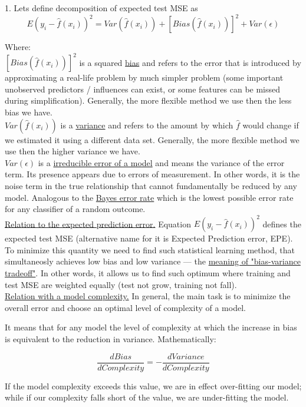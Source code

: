 \documentclass[a4paper,12pt,titlepage]{article} %
\begin{document}
1. Lets define decomposition of expected test MSE  as $$ E (y_{i} - \hat{f}(x_{i}))^{2} = Var(\hat{f}(x_{i})) + [Bias(\hat{f}(x_{i}))]^{2} + Var(\epsilon) $$

Where: \\
$ [Bias(\hat{f}(x_{i}))]^{2} $ is a squared \underline{bias} and refers to the error that is introduced by approximating a real-life problem by much simpler problem (some important unobserved predictors / influences can exist, or some features can be missed during simplification). Generally, the more flexible method we use then the less bias we have.\\

$ Var(\hat{f}(x_{i})) $ is a \underline{variance} and refers to the amount by which $ \hat{f} $ would change if we estimated it using a different data set. Generally, the more flexible method we use then the higher variance we have.\\

$ Var(\epsilon) $  is a \underline{irreducible error of a model} and means the variance of the error term. Its presence appears due to errors of measurement. In other words, it is the noise term in the true relationship that cannot fundamentally be reduced by any model. Analogous to the \underline{Bayes error rate} which is the lowest possible error rate for any classifier of a random outcome.\\

\underline{Relation to the expected prediction error.} Equation $ E (y_{i} - \hat{f}(x_{i}))^{2} $  defines the expected test MSE (alternative name for it is Expected Prediction error, EPE). To minimize this quantity we need to find such statistical learning method, that simultaneosly achieves low bias and low variance --- the \underline{meaning of "bias-variance tradeoff"}. In other words, it allows us to find such optimum where training and test MSE are weighted equally (test not grow, training not fall).\\

\underline{Relation with a model complexity.} In general, the main task is to minimize the overall error and choose an optimal level of complexity of a model. 

It means that for any model the level of complexity at which the increase in bias is equivalent to the reduction in variance. Mathematically:

$$ \frac{d Bias}{d Complexity} = - \frac{d Variance}{d Complexity}$$

If the model complexity exceeds this value, we are in effect over-fitting our model; while if our complexity falls short of the value, we are under-fitting the model. 
\end{document}
